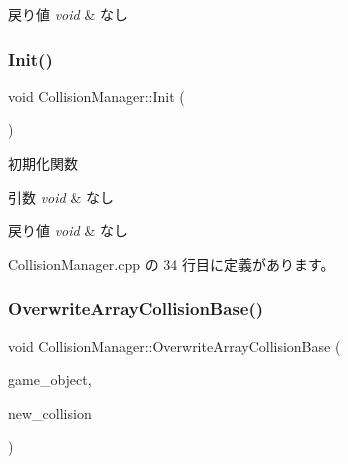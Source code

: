 \begin{DoxyRetVals}{戻り値}
{\em void} & なし \\
\hline
\end{DoxyRetVals}
\mbox{\label{class_collision_manager_a2c5770b90b7a46a5674df008a7a57145}} 
\subsubsection{\texorpdfstring{Init()}{Init()}}
{\footnotesize\ttfamily void Collision\+Manager\+::\+Init (\begin{DoxyParamCaption}{ }\end{DoxyParamCaption})}



初期化関数 


\begin{DoxyParams}{引数}
{\em void} & なし \\
\hline
\end{DoxyParams}

\begin{DoxyRetVals}{戻り値}
{\em void} & なし \\
\hline
\end{DoxyRetVals}


 Collision\+Manager.\+cpp の 34 行目に定義があります。

\mbox{\label{class_collision_manager_af9c2ce87e0189cdd1256c83decc64673}} 
\subsubsection{\texorpdfstring{Overwrite\+Array\+Collision\+Base()}{OverwriteArrayCollisionBase()}}
{\footnotesize\ttfamily void Collision\+Manager\+::\+Overwrite\+Array\+Collision\+Base (\begin{DoxyParamCaption}\item[{\mbox{\hyperlink{class_game_object_base}{Game\+Object\+Base}} $\ast$}]{game\+\_\+object,  }\item[{\mbox{\hyperlink{class_collision_base}{Collision\+Base}} $\ast$}]{new\+\_\+collision }\end{DoxyParamCaption})}



